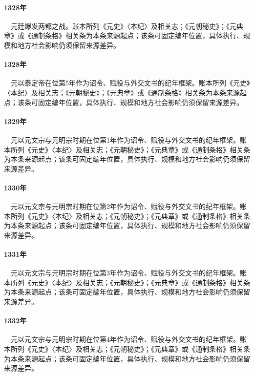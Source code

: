\paragraph{1328年}　元廷爆发两都之战。账本所列《元史》〈本纪〉及相关志；《元朝秘史》；《元典章》或《通制条格》相关条为本条来源起点；该条可固定编年位置，具体执行、规模和地方社会影响仍须保留来源差异。

\paragraph{1328年}　元以泰定帝在位第5年作为诏令、赋役与外交文书的纪年框架。账本所列《元史》〈本纪〉及相关志；《元朝秘史》；《元典章》或《通制条格》相关条为本条来源起点；该条可固定编年位置，具体执行、规模和地方社会影响仍须保留来源差异。

\paragraph{1329年}　元以元文宗与元明宗时期在位第1年作为诏令、赋役与外交文书的纪年框架。账本所列《元史》〈本纪〉及相关志；《元朝秘史》；《元典章》或《通制条格》相关条为本条来源起点；该条可固定编年位置，具体执行、规模和地方社会影响仍须保留来源差异。

\paragraph{1330年}　元以元文宗与元明宗时期在位第2年作为诏令、赋役与外交文书的纪年框架。账本所列《元史》〈本纪〉及相关志；《元朝秘史》；《元典章》或《通制条格》相关条为本条来源起点；该条可固定编年位置，具体执行、规模和地方社会影响仍须保留来源差异。

\paragraph{1331年}　元以元文宗与元明宗时期在位第3年作为诏令、赋役与外交文书的纪年框架。账本所列《元史》〈本纪〉及相关志；《元朝秘史》；《元典章》或《通制条格》相关条为本条来源起点；该条可固定编年位置，具体执行、规模和地方社会影响仍须保留来源差异。

\paragraph{1332年}　元以元文宗与元明宗时期在位第4年作为诏令、赋役与外交文书的纪年框架。账本所列《元史》〈本纪〉及相关志；《元朝秘史》；《元典章》或《通制条格》相关条为本条来源起点；该条可固定编年位置，具体执行、规模和地方社会影响仍须保留来源差异。

